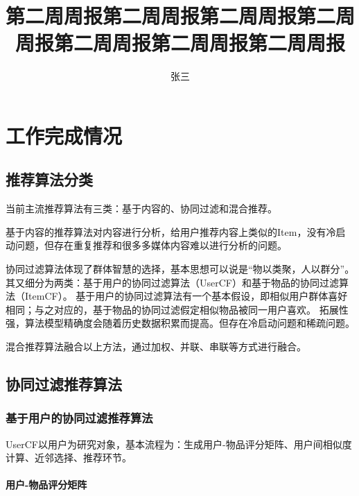 \documentclass{upctrans}
\begin{document}

\title{第二周周报第二周周报第二周周报第二周周报第二周周报第二周周报第二周周报}
\author{张三}

\maketitle

\section{工作完成情况}

\subsection{推荐算法分类}

当前主流推荐算法有三类：基于内容的、协同过滤和混合推荐。

基于内容的推荐算法对内容进行分析，给用户推荐内容上类似的Item，没有冷启动问题，但存在重复推荐和很多多媒体内容难以进行分析的问题。

协同过滤算法体现了群体智慧的选择，基本思想可以说是“物以类聚，人以群分”。
其又细分为两类：基于用户的协同过滤算法（UserCF）和基于物品的协同过滤算法（ItemCF）。
基于用户的协同过滤算法有一个基本假设，即相似用户群体喜好相同；与之对应的，基于物品的协同过滤假定相似物品被同一用户喜欢。
拓展性强，算法模型精确度会随着历史数据积累而提高。但存在冷启动问题和稀疏问题。

混合推荐算法融合以上方法，通过加权、并联、串联等方式进行融合。

\subsection{协同过滤推荐算法}

\subsubsection{基于用户的协同过滤推荐算法}

UserCF以用户为研究对象，基本流程为：生成用户-物品评分矩阵、用户间相似度计算、近邻选择、推荐环节。

\paragraph{用户-物品评分矩阵}
\end{document}
